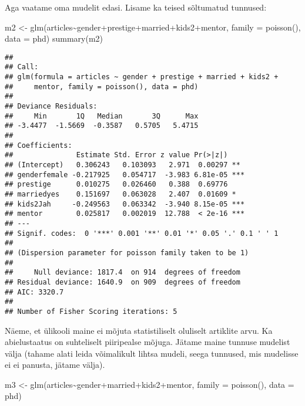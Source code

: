 \documentclass[
]{book}
\newenvironment{Shaded}{\begin{snugshade}}{\end{snugshade}}
\newcommand{\AttributeTok}[1]{\textcolor[rgb]{0.77,0.63,0.00}{#1}}
\newcommand{\FunctionTok}[1]{\textcolor[rgb]{0.00,0.00,0.00}{#1}}
\newcommand{\NormalTok}[1]{#1}
\newcommand{\OtherTok}[1]{\textcolor[rgb]{0.56,0.35,0.01}{#1}}
\newcommand{\SpecialCharTok}[1]{\textcolor[rgb]{0.00,0.00,0.00}{#1}}
\begin{document}
Aga vaatame oma mudelit edasi. Lisame ka teised sõltumatud tunnused:

\begin{Shaded}
\begin{Highlighting}[]
\NormalTok{m2 }\OtherTok{\textless{}{-}} \FunctionTok{glm}\NormalTok{(articles}\SpecialCharTok{\textasciitilde{}}\NormalTok{gender}\SpecialCharTok{+}\NormalTok{prestige}\SpecialCharTok{+}\NormalTok{married}\SpecialCharTok{+}\NormalTok{kids2}\SpecialCharTok{+}\NormalTok{mentor, }\AttributeTok{family =} \FunctionTok{poisson}\NormalTok{(), }\AttributeTok{data =}\NormalTok{ phd)}
\FunctionTok{summary}\NormalTok{(m2)}
\end{Highlighting}
\end{Shaded}

\begin{verbatim}
## 
## Call:
## glm(formula = articles ~ gender + prestige + married + kids2 + 
##     mentor, family = poisson(), data = phd)
## 
## Deviance Residuals: 
##     Min       1Q   Median       3Q      Max  
## -3.4477  -1.5669  -0.3587   0.5705   5.4715  
## 
## Coefficients:
##               Estimate Std. Error z value Pr(>|z|)    
## (Intercept)   0.306243   0.103093   2.971  0.00297 ** 
## genderfemale -0.217925   0.054717  -3.983 6.81e-05 ***
## prestige      0.010275   0.026460   0.388  0.69776    
## marriedyes    0.151697   0.063028   2.407  0.01609 *  
## kids2Jah     -0.249563   0.063342  -3.940 8.15e-05 ***
## mentor        0.025817   0.002019  12.788  < 2e-16 ***
## ---
## Signif. codes:  0 '***' 0.001 '**' 0.01 '*' 0.05 '.' 0.1 ' ' 1
## 
## (Dispersion parameter for poisson family taken to be 1)
## 
##     Null deviance: 1817.4  on 914  degrees of freedom
## Residual deviance: 1640.9  on 909  degrees of freedom
## AIC: 3320.7
## 
## Number of Fisher Scoring iterations: 5
\end{verbatim}

Näeme, et ülikooli maine ei mõjuta statistiliselt oluliselt artiklite arvu. Ka abielustaatus on suhteliselt piiripealse mõjuga. Jätame maine tunnuse mudelist välja (tahame alati leida võimalikult lihtsa mudeli, seega tunnused, mis mudelisse ei ei panusta, jätame välja).

\begin{Shaded}
\begin{Highlighting}[]
\NormalTok{m3 }\OtherTok{\textless{}{-}} \FunctionTok{glm}\NormalTok{(articles}\SpecialCharTok{\textasciitilde{}}\NormalTok{gender}\SpecialCharTok{+}\NormalTok{married}\SpecialCharTok{+}\NormalTok{kids2}\SpecialCharTok{+}\NormalTok{mentor, }\AttributeTok{family =} \FunctionTok{poisson}\NormalTok{(), }\AttributeTok{data =}\NormalTok{ phd)}
\end{Highlighting}
\end{Shaded}
\end{document}
